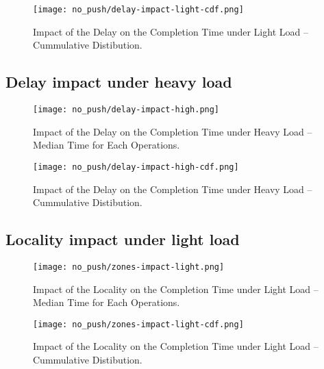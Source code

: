 \begin{figure}[H]
  \vspace{-10pt}
  \centering
  \centerline{\texttt{[image: no\_push/delay-impact-light-cdf.png]}}
  \vspace{-5pt}
  \caption{Impact of the Delay on the Completion Time under Light Load – Cummulative Distibution.}
  \vspace{-5pt}
  \label{fig:delay-impact-light-cdf}
\end{figure}

\subsection{Delay impact under heavy load}
\begin{figure}[H]
  \vspace{-10pt}
  \centering
  \centerline{\texttt{[image: no\_push/delay-impact-high.png]}}
  \vspace{-5pt}
  \caption{Impact of the Delay on the Completion Time under Heavy Load – Median Time for Each Operations.}
  \vspace{-5pt}
  \label{fig:delay-impact-high}
\end{figure}

\begin{figure}[H]
  \vspace{-10pt}
  \centering
  \centerline{\texttt{[image: no\_push/delay-impact-high-cdf.png]}}
  \vspace{-5pt}
  \caption{Impact of the Delay on the Completion Time under Heavy Load – Cummulative Distibution.}
  \vspace{-5pt}
  \label{fig:delay-impact-high-cdf}
\end{figure}

\subsection{Locality impact under light load}
\begin{figure}[H]
  \vspace{-10pt}
  \centering
  \centerline{\texttt{[image: no\_push/zones-impact-light.png]}}
  \vspace{-5pt}
  \caption{Impact of the Locality on the Completion Time under Light Load – Median Time for Each Operations.}
  \vspace{-5pt}
  \label{fig:zones-impact-light}
\end{figure}

\begin{figure}[H]
  \vspace{-10pt}
  \centering
  \centerline{\texttt{[image: no\_push/zones-impact-light-cdf.png]}}
  \vspace{-5pt}
  \caption{Impact of the Locality on the Completion Time under Light Load – Cummulative Distibution.}
  \vspace{-5pt}
  \label{fig:zones-impact-light-cdf}
\end{figure}
